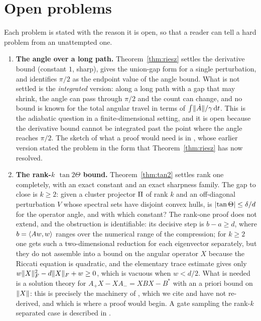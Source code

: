 \section{Open problems}\label{sec:open}

Each problem is stated with the reason it is open, so that a reader can tell a hard problem from
an unattempted one.

\begin{enumerate}[label=\textbf{O\arabic*.},leftmargin=2.4em]
\item \textbf{The angle over a long path.} Theorem~\ref{thm:riesz} settles the derivative bound
(constant $1$, sharp), gives the union-gap form for a single perturbation, and identifies $\pi/2$
as the endpoint value of the angle bound. What is not settled is the \emph{integrated} version:
along a long path with a gap that may shrink, the angle can pass through $\pi/2$ and the count can
change, and no bound is known for the total angular travel in terms of
$\int\lVert\dot A\rVert/\gamma\,\mathrm{d} t$. This is the adiabatic question in a finite-dimensional setting,
and it is open because the derivative bound cannot be integrated past the point where the angle
reaches $\pi/2$. The sketch of what a proof would need is in
, whose earlier version stated the problem in the form that
Theorem~\ref{thm:riesz} has now resolved.

\item \textbf{The rank-$k$ $\tan 2\Theta$ bound.} Theorem~\ref{thm:tan2} settles rank one
completely, with an exact constant and an exact sharpness family. The gap to close is
$k\ge2$: given a cluster projector $\Pi$ of rank $k$ and an off-diagonal perturbation $V$ whose
spectral sets have disjoint convex hulls, is $\lvert\tan\Theta\rvert\le\delta/d$ for the operator
angle, and with which constant? The rank-one proof does not extend, and the obstruction is
identifiable: its decisive step is $b-a\ge d$, where $b=\langle Aw,w\rangle$ ranges over the numerical
range of the compression; for $k\ge2$ one gets such a two-dimensional reduction for each
eigenvector separately, but they do not assemble into a bound on the angular operator
$X$ because the Riccati equation is quadratic, and the elementary trace estimate gives only
$w\lVert X\rVert_F^2-d\lVert X\rVert_F+w\ge0$, which is vacuous when $w<d/2$. What is needed is a solution
theory for $A_+X-XA_-=XBX-B^*$ with an a priori bound on $\lVert X\rVert$: this is precisely the
machinery of \cite{kmm1,kmm2,kmm3}, which we cite and have not re-derived, and which is where a
proof would begin. A gate sampling the rank-$k$ separated case is described in
.


\end{enumerate}
